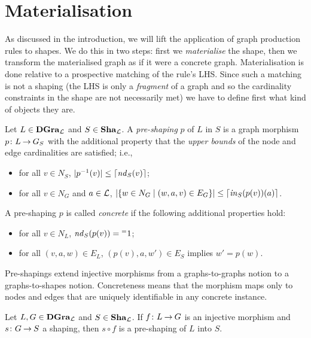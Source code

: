 \section{Materialisation}

As discussed in the introduction, we will lift the application of graph
production rules to shapes.  We do this in two steps: first we
\emph{materialise} the shape, then we transform the materialised graph as if it
were a concrete graph.  Materialisation is done relative to a prospective
matching of the rule's LHS. Since such a matching is
not a shaping (the LHS is only a \emph{fragment} of a graph and so
the cardinality constraints in the shape are not necessarily met) we have to
define first what kind of objects they are.

\begin{definition}
  Let $L\in \mathbf{DGra}_{\cal L}$ and $S\in \mathbf{Sha}_{\cal L}$. A \emph{pre-shaping} $p$ of $L$ in
  $S$ is a graph morphism $p\colon {L} \mathbin{\rightarrow} {G_S}$ with the additional property that
  the \emph{upper bounds} of the node and edge cardinalities are satisfied;
  i.e.,
%
  \begin{itemize}\noitemsep\smalltopsep
  \item for all $v\in N_S$, $|{p^{-1}(v)}| \leq {\lceil}{\mathit{nd}_S(v)}{\rceil}$;
  \item for all $v\in N_G$ and $a\in {\cal L}$, $|{{\textstyle\mathopen\{ w\in N_G \mid (w,a,v) \in
    E_G \mathclose\}}}| \leq {\lceil}{\mathit{in}_S(p(v))(a)}{\rceil}$.
  \end{itemize}\smallbottomsep
%
  A pre-shaping $p$ is called \emph{concrete} if the following additional
  properties hold:
%
  \begin{itemize}\noitemsep\smalltopsep
  \item for all $v\in N_L$, $\mathit{nd}_S(p(v))={{}^{=}{1}}$;
  \item for all $(v,a,w)\in E_L$, $(p(v),a,w')\in E_S$ implies $w'=p(w)$.
  \end{itemize}
\end{definition}
%
Pre-shapings extend injective morphisms from a graphs-to-graphs notion to a
graphs-to-shapes notion. Concreteness means that the morphism maps only to
nodes and edges that are uniquely identifiable in any concrete instance.
%
\begin{proposition}
  Let $L,G\in \mathbf{DGra}_{\cal L}$ and $S\in \mathbf{Sha}_{\cal L}$. If $f\colon {L} \mathbin{\rightarrow} {G}$ is an
  injective morphism and $s\colon {G} \mathbin{\rightarrow} {S}$ a shaping, then $s\circ f$ is a
  pre-shaping of $L$ into $S$.
\end{proposition}
